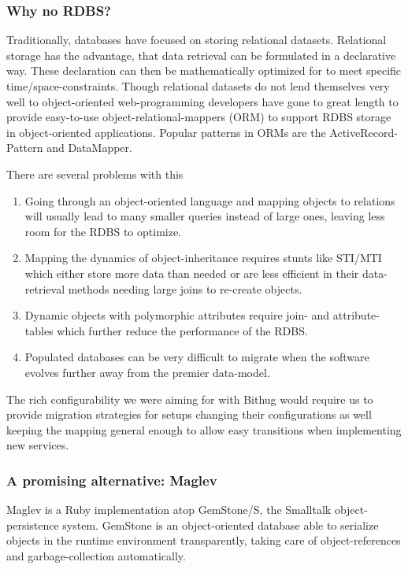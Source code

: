\subsubsection{Why no RDBS?}
Traditionally, databases have focused on storing relational datasets. 
Relational storage has the advantage, that data retrieval can be formulated in 
a declarative way. These declaration can then be mathematically optimized for 
to meet specific time/space-constraints.
Though relational datasets do not lend themselves very well to object-oriented 
web-programming developers have gone to great length to provide easy-to-use 
object-relational-mappers (ORM) to support RDBS storage in object-oriented 
applications. Popular patterns in ORMs are the ActiveRecord-Pattern
and DataMapper\cite{paikens-use}.

There are several problems with this
\begin{enumerate}
  \item Going through an object-oriented language and mapping objects to 
    relations will usually lead to many smaller queries instead of large 
    ones, leaving less room for the RDBS to optimize. 
  \item Mapping the dynamics of object-inheritance requires stunts like 
    STI/MTI which either store more data than needed or are less efficient in 
    their data-retrieval methods needing large joins to re-create objects.
  \item Dynamic objects with polymorphic attributes require join- and 
    attribute-tables which further reduce the performance of the RDBS.
  \item Populated databases can be very difficult to migrate when the software 
    evolves further away from the premier data-model.
\end{enumerate}

The rich configurability we were aiming for with Bithug would require us to 
provide migration strategies for setups changing their configurations as well 
keeping the mapping general enough to allow easy transitions when implementing 
new services.
\subsubsection{A promising alternative: Maglev}
Maglev is a Ruby implementation atop GemStone/S, the Smalltalk 
object-persistence system. GemStone is an object-oriented database able to 
serialize objects in the runtime environment transparently, taking care of 
object-references and garbage-collection automatically.

